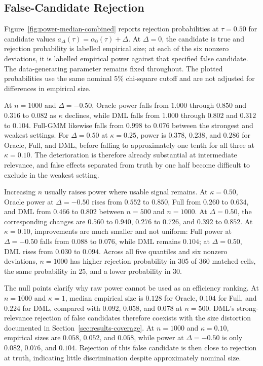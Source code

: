 \subsection{False-Candidate Rejection}
\label{sec:results-power}

Figure~\ref{fig:power-median-combined} reports rejection probabilities at $\tau=0.50$ for candidate values $a_{\Delta}(\tau)=\alpha_0(\tau)+\Delta$. At $\Delta=0$, the candidate is true and rejection probability is labelled empirical size; at each of the six nonzero deviations, it is labelled empirical power against that specified false candidate. The data-generating parameter remains fixed throughout. The plotted probabilities use the same nominal 5\% chi-square cutoff and are not adjusted for differences in empirical size.



At $n=1000$ and $\Delta=-0.50$, Oracle power falls from $1.000$ through $0.850$ and $0.316$ to $0.082$ as $\kappa$ declines, while DML falls from $1.000$ through $0.802$ and $0.312$ to $0.104$. Full-GMM likewise falls from $0.998$ to $0.076$ between the strongest and weakest settings. For $\Delta=0.50$ at $\kappa=0.25$, power is $0.378$, $0.238$, and $0.286$ for Oracle, Full, and DML, before falling to approximately one tenth for all three at $\kappa=0.10$. The deterioration is therefore already substantial at intermediate relevance, and false effects separated from truth by one half become difficult to exclude in the weakest setting.

Increasing $n$ usually raises power where usable signal remains. At $\kappa=0.50$, Oracle power at $\Delta=-0.50$ rises from $0.552$ to $0.850$, Full from $0.260$ to $0.634$, and DML from $0.466$ to $0.802$ between $n=500$ and $n=1000$. At $\Delta=0.50$, the corresponding changes are $0.560$ to $0.940$, $0.276$ to $0.726$, and $0.392$ to $0.852$. At $\kappa=0.10$, improvements are much smaller and not uniform: Full power at $\Delta=-0.50$ falls from $0.088$ to $0.076$, while DML remains $0.104$; at $\Delta=0.50$, DML rises from $0.030$ to $0.094$. Across all five quantiles and six nonzero deviations, $n=1000$ has higher rejection probability in 305 of 360 matched cells, the same probability in 25, and a lower probability in 30.

The null points clarify why raw power cannot be used as an efficiency ranking. At $n=1000$ and $\kappa=1$, median empirical size is $0.128$ for Oracle, $0.104$ for Full, and $0.224$ for DML, compared with $0.092$, $0.058$, and $0.078$ at $n=500$. DML's strong-relevance rejection of false candidates therefore coexists with the size distortion documented in Section~\ref{sec:results-coverage}. At $n=1000$ and $\kappa=0.10$, empirical sizes are $0.058$, $0.052$, and $0.058$, while power at $\Delta=-0.50$ is only $0.082$, $0.076$, and $0.104$. Rejection of this false candidate is then close to rejection at truth, indicating little discrimination despite approximately nominal size.

